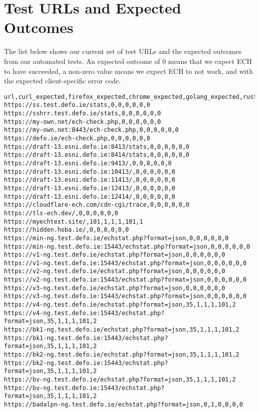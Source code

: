 
\section{Test URLs and Expected Outcomes}
\label{app:urls}

The list below shows our current set of test URLs and the expected outcomes
from our automated tests.  An expected outcome of 0 means that we expect ECH to
have succeeded, a non-zero value means we expect ECH to not work, and with the
expected client-specific error code.

\tiny
\begin{verbatim}
url,curl_expected,firefox_expected,chrome_expected,golang_expected,rust_expected,py_expected
https://ss.test.defo.ie/stats,0,0,0,0,0,0
https://sshrr.test.defo.ie/stats,0,0,0,0,0,0
https://my-own.net/ech-check.php,0,0,0,0,0,0
https://my-own.net:8443/ech-check.php,0,0,0,0,0,0
https://defo.ie/ech-check.php,0,0,0,0,0,0
https://draft-13.esni.defo.ie:8413/stats,0,0,0,0,0,0
https://draft-13.esni.defo.ie:8414/stats,0,0,0,0,0,0
https://draft-13.esni.defo.ie:9413/,0,0,0,0,0,0
https://draft-13.esni.defo.ie:10413/,0,0,0,0,0,0
https://draft-13.esni.defo.ie:11413/,0,0,0,0,0,0
https://draft-13.esni.defo.ie:12413/,0,0,0,0,0,0
https://draft-13.esni.defo.ie:12414/,0,0,0,0,0,0
https://cloudflare-ech.com/cdn-cgi/trace,0,0,0,0,0,0
https://tls-ech.dev/,0,0,0,0,0,0
https://myechtest.site/,101,1,1,1,101,1
https://hidden.hoba.ie/,0,0,0,0,0,0
https://min-ng.test.defo.ie/echstat.php?format=json,0,0,0,0,0,0
https://min-ng.test.defo.ie:15443/echstat.php?format=json,0,0,0,0,0,0
https://v1-ng.test.defo.ie/echstat.php?format=json,0,0,0,0,0,0
https://v1-ng.test.defo.ie:15443/echstat.php?format=json,0,0,0,0,0,0
https://v2-ng.test.defo.ie/echstat.php?format=json,0,0,0,0,0,0
https://v2-ng.test.defo.ie:15443/echstat.php?format=json,0,0,0,0,0,0
https://v3-ng.test.defo.ie/echstat.php?format=json,0,0,0,0,0,0
https://v3-ng.test.defo.ie:15443/echstat.php?format=json,0,0,0,0,0,0
https://v4-ng.test.defo.ie/echstat.php?format=json,35,1,1,1,101,2
https://v4-ng.test.defo.ie:15443/echstat.php?format=json,35,1,1,1,101,2
https://bk1-ng.test.defo.ie/echstat.php?format=json,35,1,1,1,101,2
https://bk1-ng.test.defo.ie:15443/echstat.php?format=json,35,1,1,1,101,2
https://bk2-ng.test.defo.ie/echstat.php?format=json,35,1,1,1,101,2
https://bk2-ng.test.defo.ie:15443/echstat.php?format=json,35,1,1,1,101,2
https://bv-ng.test.defo.ie/echstat.php?format=json,35,1,1,1,101,2
https://bv-ng.test.defo.ie:15443/echstat.php?format=json,35,1,1,1,101,2
https://badalpn-ng.test.defo.ie/echstat.php?format=json,0,1,0,0,0,0

\end{verbatim}

